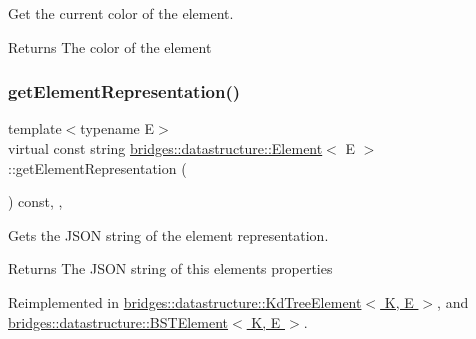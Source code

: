 Get the current color of the element. 

\begin{DoxyReturn}{Returns}
The color of the element 
\end{DoxyReturn}
\mbox{\label{classbridges_1_1datastructure_1_1_element_a285fc51d6dfcb8bff2d72f7e4addfe6d}} 
\subsubsection{\texorpdfstring{get\+Element\+Representation()}{getElementRepresentation()}}
{\footnotesize\ttfamily template$<$typename E$>$ \\
virtual const string \hyperlink{classbridges_1_1datastructure_1_1_element}{bridges\+::datastructure\+::\+Element}$<$ E $>$\+::get\+Element\+Representation (\begin{DoxyParamCaption}{ }\end{DoxyParamCaption}) const\hspace{0.3cm}{\ttfamily [inline]}, {\ttfamily [protected]}, {\ttfamily [virtual]}}



Gets the J\+S\+ON string of the element representation. 

\begin{DoxyReturn}{Returns}
The J\+S\+ON string of this element\textquotesingle{}s properties 
\end{DoxyReturn}


Reimplemented in \hyperlink{classbridges_1_1datastructure_1_1_kd_tree_element_a5413ecaf152e3df5fb45dd85da812888}{bridges\+::datastructure\+::\+Kd\+Tree\+Element$<$ K, E $>$}, and \hyperlink{classbridges_1_1datastructure_1_1_b_s_t_element_a8f962a01b6e0eff59abeee7768264fd9}{bridges\+::datastructure\+::\+B\+S\+T\+Element$<$ K, E $>$}.

\mbox{\label{classbridges_1_1datastructure_1_1_element_a44949edf79379a4d48490e98c15992a6}} 
